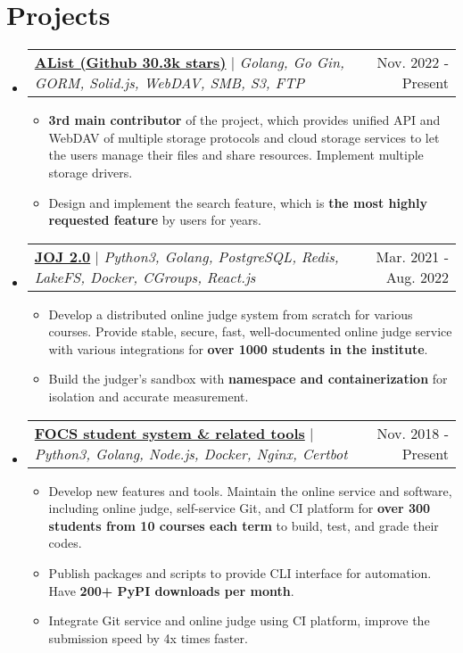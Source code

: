 \documentclass[letterpaper,11pt]{article}
\makeatletter
\newcommand{\resumeItem}[1]{
  \item\small{
    {#1 \vspace{-2pt}}
  }
}
\newcommand{\resumeProjectHeader}[2]{
    \item
    \begin{tabular*}{0.98\textwidth}{l@{\extracolsep{\fill}}r}
      \small#1 & #2 \\
    \end{tabular*}\vspace{-7pt}
}
\newcommand{\resumeSubHeaderListStart}{\begin{itemize}[leftmargin=0.15in, label={}]}
\newcommand{\resumeSubHeaderListEnd}{\end{itemize}}
\newcommand{\resumeItemListStart}{\begin{itemize}}
\newcommand{\resumeItemListEnd}{\end{itemize}\vspace{-5pt}}
\makeatother
\begin{document}
\section{Projects}
    \resumeSubHeaderListStart
      \resumeProjectHeader
        {\href{https://github.com/alist-org/alist}{\textbf{AList (Github 30.3k stars)}} $|$ \emph{Golang, Go Gin, GORM, Solid.js, WebDAV, SMB, S3, FTP}}{Nov. 2022 - Present}
        \resumeItemListStart
          \resumeItem{\textbf{3rd main contributor} of the project, which provides unified API and WebDAV of multiple storage protocols and cloud storage services to let the users manage their files and share resources. Implement multiple storage drivers.}
          \resumeItem{Design and implement the search feature, which is \textbf{the most highly requested feature} by users for years.}
        \resumeItemListEnd
      \resumeProjectHeader
        {\href{https://github.com/joint-online-judge}{\textbf{JOJ 2.0}} $|$ \emph{Python3, Golang, PostgreSQL, Redis, LakeFS, Docker, CGroups, React.js}}{Mar. 2021 - Aug. 2022}
        \resumeItemListStart
          \resumeItem{Develop a distributed online judge system from scratch for various courses. Provide stable, secure, fast, well-documented online judge service with various integrations for \textbf{over 1000 students in the institute}.}
          \resumeItem{Build the judger's sandbox with \textbf{namespace and containerization} for isolation and accurate measurement.}
        \resumeItemListEnd
      \resumeProjectHeader
        {\href{https://gist.github.com/BoYanZh/fc4469c20fd6adf42c212114532aaac0}{\textbf{FOCS student system \& related tools}} $|$ \emph{Python3, Golang, Node.js, Docker, Nginx, Certbot}}{Nov. 2018 - Present}
        \resumeItemListStart
          \resumeItem{Develop new features and tools. Maintain the online service and software, including online judge, self-service Git, and CI platform for \textbf{over 300 students from 10 courses each term} to build, test, and grade their codes.}
          \resumeItem{Publish packages and scripts to provide CLI interface for automation. Have \textbf{200+ PyPI downloads per month}. \\}
          \resumeItem{Integrate Git service and online judge using CI platform, improve the submission speed by 4x times faster.}
        \resumeItemListEnd
    \resumeSubHeaderListEnd
\end{document}
